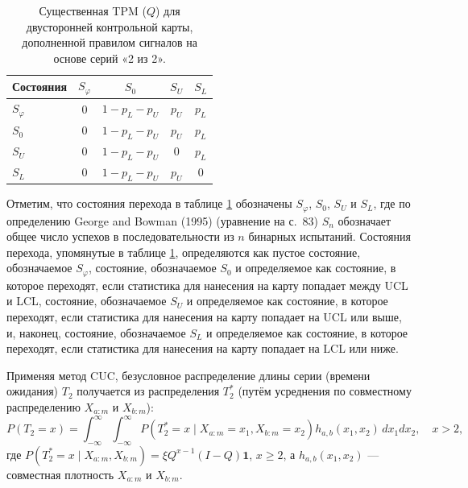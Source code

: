 \begin{table}[!ht]
	\centering
	\caption{Существенная TPM (\(Q\)) для двусторонней контрольной карты, дополненной правилом сигналов на основе серий «2 из 2».}
	\label{tab:4.29}
	\begin{tabular}{@{}lcccc@{}}
		\toprule
		Состояния & \(S_\varphi\) & \(S_0\) & \(S_U\) & \(S_L\) \\
		\midrule
		\(S_\varphi\) & 0 & \(1 - p_L - p_U\) & \(p_U\) & \(p_L\) \\
		\(S_0\) & 0 & \(1 - p_L - p_U\) & \(p_U\) & \(p_L\) \\
		\(S_U\) & 0 & \(1 - p_L - p_U\) & 0 & \(p_L\) \\
		\(S_L\) & 0 & \(1 - p_L - p_U\) & \(p_U\) & 0 \\
		\bottomrule
	\end{tabular}
\end{table}

Отметим, что состояния перехода в таблице \ref{tab:4.29} обозначены \(S_\varphi\), \(S_0\), \(S_U\) и \(S_L\), где по определению George and Bowman (1995) (уравнение на с.~83) \(S_n\) обозначает общее число успехов в последовательности из \(n\) бинарных испытаний. Состояния перехода, упомянутые в таблице \ref{tab:4.29}, определяются как пустое состояние, обозначаемое \(S_\varphi\), состояние, обозначаемое \(S_0\) и определяемое как состояние, в которое переходят, если статистика для нанесения на карту попадает между UCL и LCL, состояние, обозначаемое \(S_U\) и определяемое как состояние, в которое переходят, если статистика для нанесения на карту попадает на UCL или выше, и, наконец, состояние, обозначаемое \(S_L\) и определяемое как состояние, в которое переходят, если статистика для нанесения на карту попадает на LCL или ниже.

Применяя метод CUC, безусловное распределение длины серии (времени ожидания) \(T_2\) получается из распределения \(T_2^*\) (путём усреднения по совместному распределению \(X_{a:m}\) и \(X_{b:m}\)):
\[
	P(T_2 = x) = \int_{-\infty}^{\infty}\int_{-\infty}^{\infty} P\left( T_2^* = x \mid X_{a:m} = x_1, X_{b:m} = x_2 \right) h_{a,b}(x_1, x_2)\, dx_1 dx_2, \quad x > 2,
\]
где \(P\left( T_2^* = x \mid X_{a:m}, X_{b:m} \right) = \xi Q^{x-1}(I - Q)\mathbf{1}\), \(x \ge 2\), а \(h_{a,b}(x_1, x_2)\) --- совместная плотность \(X_{a:m}\) и \(X_{b:m}\).

